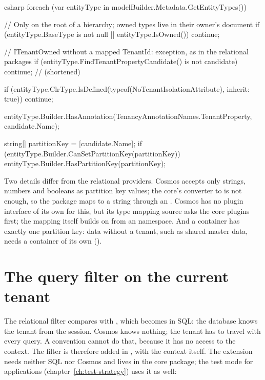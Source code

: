 \begin{sourcecode}{csharp}
foreach (var entityType in modelBuilder.Metadata.GetEntityTypes())
{
    // Only on the root of a hierarchy; owned types live in their owner's document
    if (entityType.BaseType is not null || entityType.IsOwned())
        continue;

    // ITenantOwned without a mapped TenantId: exception, as in the relational packages
    if (entityType.FindTenantPropertyCandidate() is not { } candidate)
        continue;      // (shortened)

    if (entityType.ClrType.IsDefined(typeof(NoTenantIsolationAttribute), inherit: true))
        continue;

    entityType.Builder.HasAnnotation(TenancyAnnotationNames.TenantProperty, candidate.Name);

    string[] partitionKey = [candidate.Name];
    if (entityType.Builder.CanSetPartitionKey(partitionKey))
        entityType.Builder.HasPartitionKey(partitionKey);
}
\end{sourcecode}

Two details differ from the relational providers. Cosmos accepts only strings, numbers and
booleans as partition key values; the core's converter to  is not enough, so the
package maps  to a string through an
. Cosmos has no plugin
interface of its own for this, but its type mapping source asks the core plugins first; the
mapping itself builds on  from an
 namespace. And a container has exactly one partition key: data without a
tenant, such as shared master data, needs a container of its own
().

\section{The query filter on the current tenant}

The relational filter compares with ,
which becomes  in SQL: the database knows the
tenant from the session. Cosmos knows nothing; the tenant has to travel with every query. A
convention cannot do that, because it has no access to the context. The filter is therefore
added in , with the context itself. The
extension needs neither SQL nor Cosmos and lives in the core package; the test mode for
applications (chapter~\ref{ch:test-strategy}) uses it as well:

